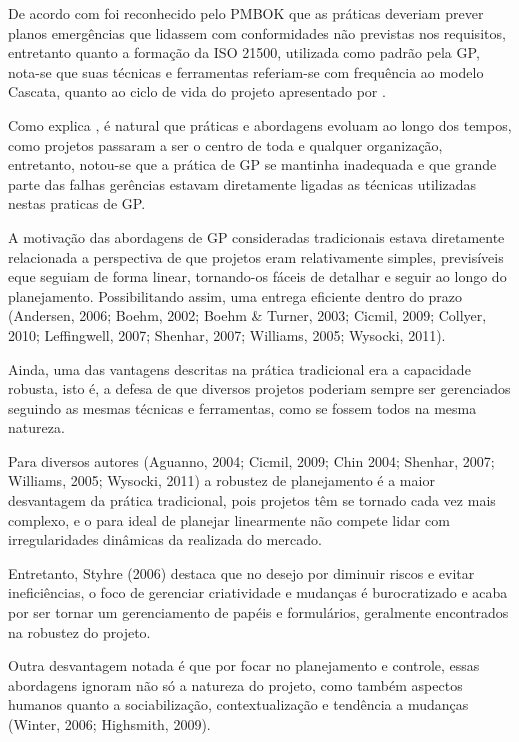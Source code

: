 De acordo com  foi reconhecido pelo PMBOK que as práticas deveriam prever planos emergências que lidassem com conformidades não previstas nos requisitos, entretanto quanto a formação da ISO 21500, utilizada como padrão pela GP, nota-se que suas técnicas e ferramentas referiam-se com frequência ao modelo Cascata, quanto ao ciclo de vida do projeto apresentado por .

Como explica , é natural que práticas e abordagens evoluam ao longo dos tempos, como projetos passaram a ser o centro de toda e qualquer organização, entretanto, notou-se que a prática de GP se mantinha inadequada e que grande parte das falhas gerências estavam diretamente ligadas as técnicas utilizadas nestas praticas de GP.

A motivação das abordagens de GP consideradas tradicionais estava diretamente relacionada a perspectiva de que projetos eram relativamente simples, previsíveis eque seguiam de forma linear, tornando-os fáceis de detalhar e seguir ao longo do planejamento. Possibilitando assim, uma entrega eficiente dentro do prazo (Andersen, 2006; Boehm, 2002; Boehm \& Turner, 2003; Cicmil, 2009; Collyer, 2010; Leffingwell, 2007; Shenhar, 2007; Williams, 2005; Wysocki, 2011).

Ainda, uma das vantagens descritas na prática tradicional era a capacidade robusta, isto é, a defesa de que diversos projetos poderiam sempre ser gerenciados seguindo as mesmas técnicas e ferramentas, como se fossem todos na mesma natureza.

Para diversos autores (Aguanno, 2004; Cicmil, 2009; Chin 2004; Shenhar, 2007; Williams, 2005; Wysocki, 2011) a robustez de planejamento é a maior desvantagem da prática tradicional, pois projetos têm se tornado cada vez mais complexo, e o para ideal de planejar linearmente não compete lidar com irregularidades dinâmicas da realizada do mercado.

Entretanto, Styhre (2006) destaca que no desejo por diminuir riscos e evitar ineficiências, o foco de gerenciar criatividade e mudanças é burocratizado e acaba por ser tornar um gerenciamento de papéis e formulários, geralmente encontrados na robustez do projeto.

Outra desvantagem notada é que por focar no planejamento e controle, essas abordagens ignoram não só a natureza do projeto, como também aspectos humanos quanto a sociabilização, contextualização e tendência a mudanças (Winter, 2006; Highsmith, 2009).


